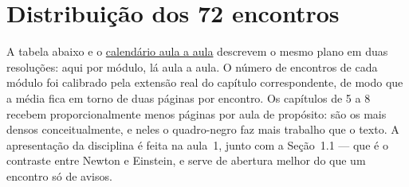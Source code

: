 \documentclass[12pt,a4paper,oneside]{book}
\theoremstyle{rgplain}
\theoremstyle{rgremark}
\begin{document}
\section*{Distribuição dos 72 encontros}
{}

A tabela abaixo e o \hyperref[sec:calendario]{calendário aula a aula} descrevem o mesmo
plano em duas resoluções: aqui por módulo, lá aula a aula. O número de
encontros de cada módulo foi calibrado pela extensão real do capítulo
correspondente, de modo que a média fica em torno de duas páginas por
encontro. Os capítulos de 5 a 8 recebem proporcionalmente menos páginas por
aula de propósito: são os mais densos conceitualmente, e neles o quadro-negro
faz mais trabalho que o texto. A apresentação da disciplina é feita na aula~1,
junto com a Seção~1.1 --- que é o contraste entre Newton e Einstein, e serve de
abertura melhor do que um encontro só de avisos.
\end{document}
